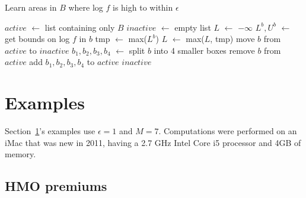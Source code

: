 \documentclass[ejs]{imsart}
\newcommand*\Let[2]{\State #1 $\gets$ #2}
\begin{document}
\begin{algorithm}[H]
  \caption{Learn areas in $B$ where log $f$ is high to within $\epsilon$
    \label{alg:findf}}
  \begin{algorithmic}[1]
      \Let{$active$}{list containing only $B$}
      \Let{$inactive$}{empty list}
      \Let{$L$}{$-\infty$}
          \Let{$L^b, U^b$}{get bounds on log $f$ in $b$ }
        \EndFor
          \Let{tmp}{max($L^b$)}
         \Let{$L$}{max($L$, tmp)}
            \State move $b$ from $active$ to $inactive$
          \Else
            \Let{$b_1, b_2, b_3, b_4$}{split $b$ into 4 smaller boxes}
            \State remove $b$ from $active$
            \State add $b_1, b_2, b_3, b_4$ to $active$
          \EndIf
        \EndFor
      \EndWhile
      \State \Return $inactive$ 
    \EndFunction
  \end{algorithmic}
\end{algorithm}


\section{Examples}
\label{sec:examp}
Section~\ref{sec:examp}'s examples use $\epsilon = 1$ and $M = 7$.
Computations were performed on an iMac that was new in 2011, having a 2.7 GHz Intel Core i5 processor and 4GB of memory.
\subsection{HMO premiums}
\end{document}
